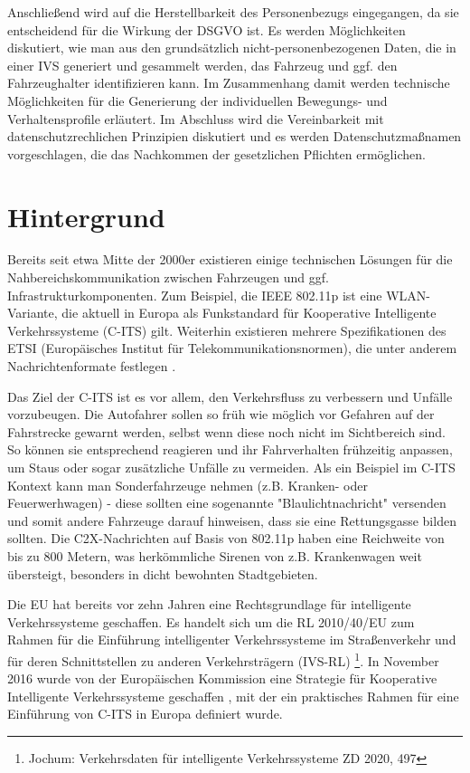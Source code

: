 Anschließend wird auf die Herstellbarkeit des Personenbezugs eingegangen, da sie entscheidend für die Wirkung der DSGVO ist. Es werden Möglichkeiten diskutiert, wie man aus den grundsätzlich nicht-personenbezogenen Daten, die in einer IVS generiert und gesammelt werden, das Fahrzeug und ggf. den Fahrzeughalter identifizieren kann. Im Zusammenhang damit werden technische Möglichkeiten für die Generierung der individuellen Bewegungs- und Verhaltensprofile erläutert. Im Abschluss wird die Vereinbarkeit mit datenschutzrechlichen Prinzipien diskutiert und es werden Datenschutzmaßnamen vorgeschlagen, die das Nachkommen der gesetzlichen Pflichten ermöglichen.


\section{Hintergrund}
\label{ch:Citation}

Bereits seit etwa Mitte der 2000er existieren einige technischen Lösungen für die Nahbereichskommunikation zwischen Fahrzeugen und ggf. Infrastrukturkomponenten. Zum Beispiel, die IEEE 802.11p ist eine WLAN-Variante, die aktuell in Europa als Funkstandard für Kooperative Intelligente Verkehrssysteme (C-ITS) gilt. Weiterhin existieren mehrere Spezifikationen des ETSI (Europäisches Institut für Telekommunikationsnormen), die unter anderem Nachrichtenformate festlegen \cite{Strubbe2017}. 

Das Ziel der C-ITS ist es vor allem, den Verkehrsfluss zu verbessern und Unfälle vorzubeugen. Die Autofahrer sollen so früh wie möglich vor Gefahren auf der Fahrstrecke gewarnt werden, selbst wenn diese noch nicht im Sichtbereich sind. So können sie entsprechend reagieren und ihr Fahrverhalten frühzeitig anpassen, um Staus oder sogar zusätzliche Unfälle zu vermeiden. Als ein Beispiel im C-ITS Kontext kann man Sonderfahrzeuge nehmen (z.B. Kranken- oder Feuerwerhwagen) - diese sollten eine sogenannte "Blaulichtnachricht" versenden und somit andere Fahrzeuge darauf hinweisen, dass sie eine Rettungsgasse bilden sollten. Die C2X-Nachrichten auf Basis von 802.11p haben eine Reichweite von bis zu 800 Metern, was herkömmliche Sirenen von z.B. Krankenwagen weit übersteigt, besonders in dicht bewohnten Stadtgebieten.

Die EU hat bereits vor zehn Jahren eine Rechtsgrundlage für intelligente Verkehrssysteme geschaffen. Es handelt sich um die RL 2010/40/EU zum Rahmen für die Einführung intelligenter Verkehrssysteme im Straßenverkehr und für deren Schnittstellen zu anderen Verkehrsträgern (IVS-RL) \footnote{Jochum: Verkehrsdaten für intelligente Verkehrssysteme ZD 2020, 497}. In November 2016 wurde von der Europäischen Kommission eine Strategie für Kooperative Intelligente Verkehrssysteme geschaffen \cite{CITS2016}, mit der ein praktisches Rahmen für eine Einführung von C-ITS in Europa definiert wurde. 


